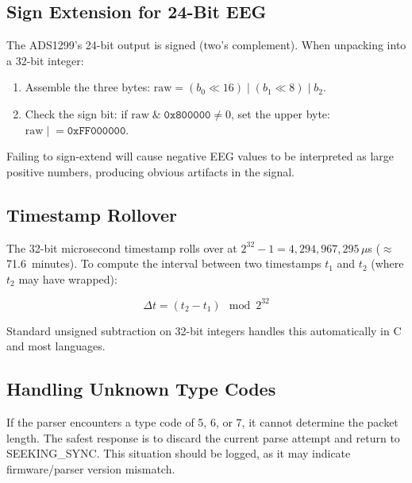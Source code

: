 \documentclass[11pt,a4paper]{article}
\newcommand{\hexval}[1]{\texttt{0x#1}}
\begin{document}
\subsection{Sign Extension for 24-Bit EEG}

The ADS1299's 24-bit output is signed (two's complement).  When unpacking into a 32-bit integer:

\begin{enumerate}
    \item Assemble the three bytes: $\text{raw} = (b_0 \ll 16) \;|\; (b_1 \ll 8) \;|\; b_2$.
    \item Check the sign bit: if $\text{raw} \;\&\; \hexval{800000} \neq 0$, set the upper byte: $\text{raw} \;|\;= \hexval{FF000000}$.
\end{enumerate}

Failing to sign-extend will cause negative EEG values to be interpreted as large positive numbers, producing obvious artifacts in the signal.

\subsection{Timestamp Rollover}

The 32-bit microsecond timestamp rolls over at $2^{32} - 1 = 4{,}294{,}967{,}295$\,$\mu$s (${\approx}$71.6~minutes).  To compute the interval between two timestamps $t_1$ and $t_2$ (where $t_2$ may have wrapped):

\[
\Delta t = (t_2 - t_1) \mod 2^{32}
\]

Standard unsigned subtraction on 32-bit integers handles this automatically in C and most languages.

\subsection{Handling Unknown Type Codes}

If the parser encounters a type code of 5, 6, or 7, it cannot determine the packet length.  The safest response is to discard the current parse attempt and return to SEEKING\_SYNC.  This situation should be logged, as it may indicate firmware/parser version mismatch.
\end{document}
